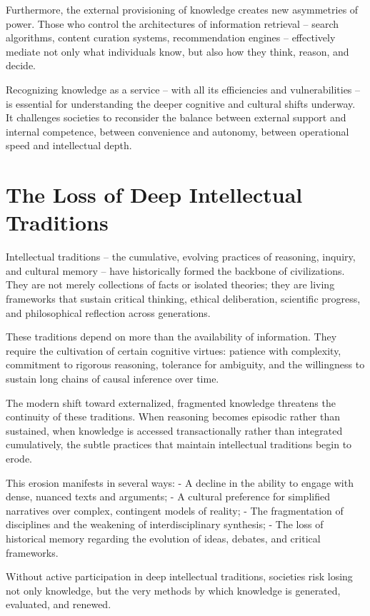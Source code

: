 Furthermore, the external provisioning of knowledge creates new
asymmetries of power. Those who control the architectures of information
retrieval -- search algorithms, content curation systems, recommendation
engines -- effectively mediate not only what individuals know, but also
how they think, reason, and decide.

Recognizing knowledge as a service -- with all its efficiencies and
vulnerabilities -- is essential for understanding the deeper cognitive
and cultural shifts underway. It challenges societies to reconsider the
balance between external support and internal competence, between
convenience and autonomy, between operational speed and intellectual
depth.


\section{The Loss of Deep Intellectual Traditions}

Intellectual traditions -- the cumulative, evolving practices of
reasoning, inquiry, and cultural memory -- have historically formed the
backbone of civilizations. They are not merely collections of facts or
isolated theories; they are living frameworks that sustain critical
thinking, ethical deliberation, scientific progress, and philosophical
reflection across generations.

These traditions depend on more than the availability of information.
They require the cultivation of certain cognitive virtues: patience with
complexity, commitment to rigorous reasoning, tolerance for ambiguity,
and the willingness to sustain long chains of causal inference over
time.

The modern shift toward externalized, fragmented knowledge threatens the
continuity of these traditions. When reasoning becomes episodic rather
than sustained, when knowledge is accessed transactionally rather than
integrated cumulatively, the subtle practices that maintain intellectual
traditions begin to erode.

This erosion manifests in several ways: - A decline in the ability to
engage with dense, nuanced texts and arguments; - A cultural preference
for simplified narratives over complex, contingent models of reality; -
The fragmentation of disciplines and the weakening of interdisciplinary
synthesis; - The loss of historical memory regarding the evolution of
ideas, debates, and critical frameworks.

Without active participation in deep intellectual traditions, societies
risk losing not only knowledge, but the very methods by which knowledge
is generated, evaluated, and renewed.


